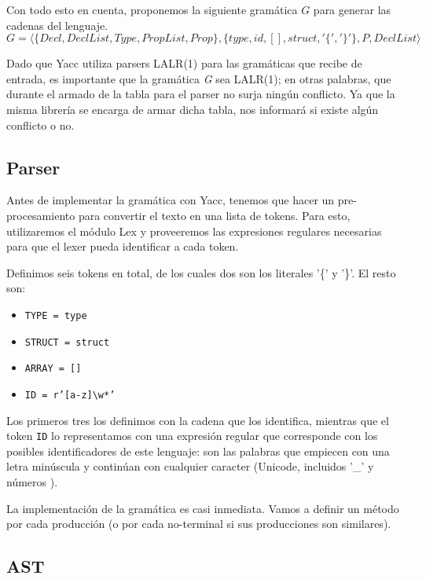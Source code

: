     Con todo esto en cuenta, proponemos la siguiente gramática $G$ para generar las cadenas del lenguaje.
\[
G = \langle\{Decl, DeclList, Type, PropList, Prop\}, \{type, id, [], struct, '\{', '\}'\}, P, DeclList\rangle
\]

Dado que Yacc utiliza parsers LALR(1) para las gramáticas que recibe de entrada, es importante que la gramática \textit{G} sea LALR(1); en otras palabras, que durante el armado de la tabla para el parser no surja ningún conflicto. Ya que la misma librería se encarga de armar dicha tabla, nos informará si existe algún conflicto o no.

\subsection{Parser}

    Antes de implementar la gramática con Yacc, tenemos que hacer un pre-procesamiento para convertir el texto en una lista de tokens. Para esto, utilizaremos el módulo Lex y proveeremos las expresiones regulares necesarias para que el lexer pueda identificar a cada token.

    Definimos seis tokens en total, de los cuales dos son los literales '\{' y '\}'. El resto son:

\begin{itemize}
    \item \texttt{TYPE = type}
    \item \texttt{STRUCT = struct} 
    \item \texttt{ARRAY = []} 
    \item \texttt{ID = r'[a-z]\textbackslash w*'}
\end{itemize}

    Los primeros tres los definimos con la cadena que los identifica, mientras que el token \texttt{ID} lo representamos con una expresión regular que corresponde con los posibles identificadores de este lenguaje: son las palabras que empiecen con una letra minúscula y continúan con cualquier caracter (Unicode, incluidos '\_' y números \cite{re}).

    La implementación de la gramática es casi inmediata. Vamos a definir un método por cada producción (o por cada no-terminal si sus producciones son similares). 

\subsection{AST}
\label{subsec:ast}

